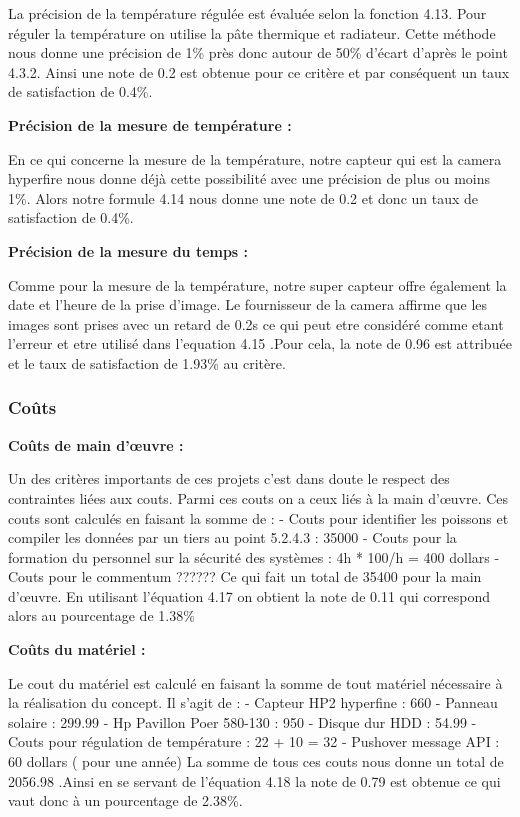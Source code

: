 La précision de la température régulée est évaluée selon la fonction 4.13. Pour réguler la température on utilise la pâte thermique et radiateur. Cette méthode nous donne une précision de 1\% près donc autour de 50\% d’écart d’après le point 4.3.2. Ainsi une note de 0.2 est obtenue pour ce critère et par conséquent un taux de satisfaction de 0.4\%.

\textbf{Précision de la mesure de température : }

En ce qui concerne la mesure de la température, notre capteur qui est la camera hyperfire nous donne déjà cette possibilité avec une précision de plus ou moins 1\%. Alors notre formule 4.14 nous donne une note de 0.2 et donc un taux de satisfaction de 0.4\%.

\textbf{Précision de la mesure du temps : }

Comme pour la mesure de la température, notre super capteur offre également la date et l’heure de la prise d’image. Le fournisseur de la camera affirme que les images sont prises avec un retard de 0.2s ce qui peut etre considéré comme etant l’erreur et etre utilisé dans l’equation 4.15 .Pour cela, la note de 0.96 est attribuée et le taux de satisfaction de 1.93\% au critère.


\subsubsection{Coûts}


\textbf{Coûts de main d’œuvre : }

Un des critères importants de ces projets c’est dans doute le respect des contraintes liées aux couts. Parmi ces couts on a ceux liés à la main d’œuvre. Ces couts sont calculés en faisant la somme de : 
-	Couts pour identifier les poissons et compiler les données par un tiers au point 5.2.4.3 : 35000
-	Couts pour la formation du personnel sur la sécurité des systèmes : 4h * 100/h = 400 dollars
-	Couts pour le commentum ??????
Ce qui fait un total de 35400 pour la main d’œuvre. En utilisant l’équation 4.17 on obtient la note de 0.11 qui correspond alors au pourcentage de 1.38\%

\textbf{Coûts du matériel : }

Le cout du matériel est calculé en faisant la somme de tout matériel nécessaire à la réalisation du concept. Il s’agit de :
-	Capteur HP2 hyperfine : 660
-	Panneau solaire : 299.99
-	Hp Pavillon Poer 580-130 : 950
-	Disque dur HDD : 54.99
-	Couts pour régulation de température : 22 + 10 = 32
-	Pushover message API : 60 dollars ( pour une année)
La somme de tous ces couts nous donne un total de 2056.98  .Ainsi en se servant de l’équation  4.18 la note de 0.79  est obtenue ce qui vaut donc à un pourcentage de 2.38\%.


